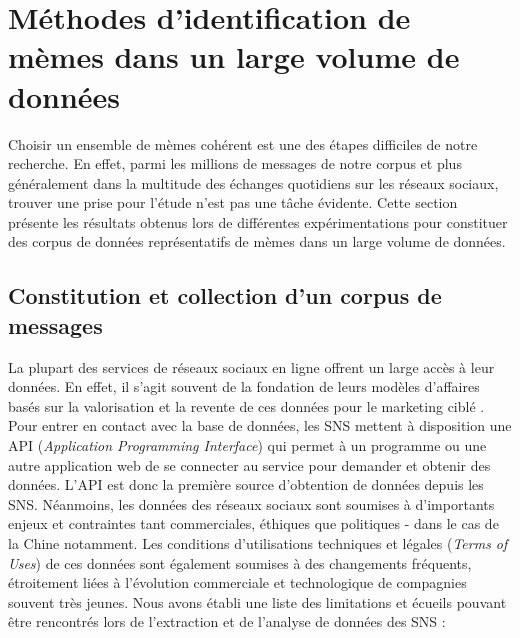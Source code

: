 \section{Méthodes d'identification de mèmes dans un large volume de données}
\label{sec:id-meme}

Choisir un ensemble de mèmes cohérent est une des étapes difficiles de notre recherche. En effet, parmi les millions de messages de notre corpus et plus généralement dans la multitude des échanges quotidiens sur les réseaux sociaux, trouver une prise pour l{\textquoteright}étude n{\textquoteright}est pas une t\^ache évidente. Cette section présente les résultats obtenus lors de différentes expérimentations pour constituer des corpus de données représentatifs de mèmes dans un large volume de données.

\subsection[Constitution et collection d{\textquoteright}un corpus de messages]{Constitution et collection d{\textquoteright}un corpus de messages}
\label{sec:weiboscope}

La plupart des services de réseaux sociaux en ligne offrent un large accès à leur données. En effet, il s{\textquoteright}agit souvent de la fondation de leurs modèles d{\textquoteright}affaires basés sur la valorisation et la revente de ces données pour le marketing ciblé \citep{Ko2010}. Pour entrer en contact avec la base de données, les SNS mettent à disposition une API (\textit{Application Programming Interface}) qui permet à un programme ou une autre application web de se connecter au service pour demander et obtenir des données. L{\textquoteright}API est donc la première source d{\textquoteright}obtention de données depuis les SNS. Néanmoins, les données des réseaux sociaux sont soumises à d{\textquoteright}importants enjeux et contraintes tant commerciales, éthiques que politiques - dans le cas de la Chine notamment. Les conditions d{\textquoteright}utilisations techniques et légales (\textit{Terms of Uses}) de ces données sont également soumises à des changements fréquents, étroitement liées à l{\textquoteright}évolution commerciale et technologique de compagnies souvent très jeunes. Nous avons établi une liste des limitations et écueils pouvant \^etre rencontrés lors de l{\textquoteright}extraction et de l{\textquoteright}analyse de données des SNS :

